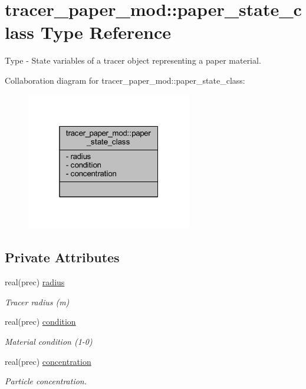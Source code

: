 \hypertarget{structtracer__paper__mod_1_1paper__state__class}{}\section{tracer\+\_\+paper\+\_\+mod\+:\+:paper\+\_\+state\+\_\+class Type Reference}
\label{structtracer__paper__mod_1_1paper__state__class}


Type -\/ State variables of a tracer object representing a paper material.  




Collaboration diagram for tracer\+\_\+paper\+\_\+mod\+:\+:paper\+\_\+state\+\_\+class\+:\nopagebreak
\begin{figure}[H]
\begin{center}
\leavevmode
\includegraphics[width=205pt]{structtracer__paper__mod_1_1paper__state__class__coll__graph}
\end{center}
\end{figure}
\subsection*{Private Attributes}
\begin{DoxyCompactItemize}
\item 
real(prec) \mbox{\hyperlink{structtracer__paper__mod_1_1paper__state__class_ac70463dad7537b4e18c6719e975a2a80}{radius}}
\begin{DoxyCompactList}\small\item\em Tracer radius (m) \end{DoxyCompactList}\item 
real(prec) \mbox{\hyperlink{structtracer__paper__mod_1_1paper__state__class_ad0c61709a67ed482b8f8dadb071c78a4}{condition}}
\begin{DoxyCompactList}\small\item\em Material condition (1-\/0) \end{DoxyCompactList}\item 
real(prec) \mbox{\hyperlink{structtracer__paper__mod_1_1paper__state__class_a6643de9258f8017d8ac1910f0b97541c}{concentration}}
\begin{DoxyCompactList}\small\item\em Particle concentration. \end{DoxyCompactList}\end{DoxyCompactItemize}


